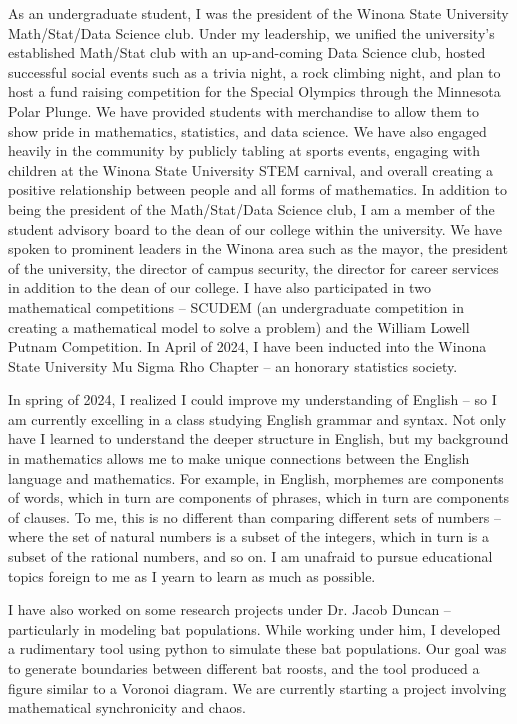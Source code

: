 \documentclass{article}
\begin{document}
\par{As an undergraduate student, I was the president of the Winona State University Math/Stat/Data Science club. Under my leadership, we unified the university's established Math/Stat club with an up-and-coming Data Science club, hosted successful social events such as a trivia night, a rock climbing night, and plan to host a fund raising competition for the Special Olympics through the Minnesota Polar Plunge. We have provided students with merchandise to allow them to show pride in mathematics, statistics, and data science. We have also engaged heavily in the community by publicly tabling at sports events, engaging with children at the Winona State University STEM carnival, and overall creating a positive relationship between people and all forms of mathematics. In addition to being the president of the Math/Stat/Data Science club, I am a member of the student advisory board to the dean of our college within the university. We have spoken to prominent leaders in the Winona area such as the mayor, the president of the university, the director of campus security, the director for career services in addition to the dean of our college. I have also participated in two mathematical competitions -- SCUDEM (an undergraduate competition in creating a mathematical model to solve a problem) and the William Lowell Putnam Competition. In April of 2024, I have been inducted into the Winona State University Mu Sigma Rho Chapter -- an honorary statistics society.}

\par{In spring of 2024, I realized I could improve my understanding of English -- so I am currently excelling in a class studying English grammar and syntax. Not only have I learned to understand the deeper structure in English, but my background in mathematics allows me to make unique connections between the English language and mathematics. For example, in English, morphemes are components of words, which in turn are components of phrases, which in turn are components of clauses. To me, this is no different than comparing different sets of numbers -- where the set of natural numbers is a subset of the integers, which in turn is a subset of the rational numbers, and so on. I am unafraid to pursue educational topics foreign to me as I yearn to learn as much as possible.}
 
\par{I have also worked on some research projects under Dr. Jacob Duncan -- particularly in modeling bat populations. While working under him, I developed a rudimentary tool using python to simulate these bat populations. Our goal was to generate boundaries between different bat roosts, and the tool produced a figure similar to a Voronoi diagram. We are currently starting a project involving mathematical synchronicity and chaos.}
\end{document}
